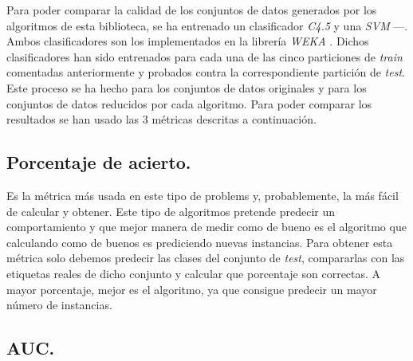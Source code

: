 Para poder comparar la calidad de los conjuntos de datos generados por los algoritmos de esta biblioteca, se ha entrenado un clasificador \textit{C4.5} \cite{c4.5} y una \textit{SVM} \cite{svm}—. Ambos clasificadores son los implementados en la librería \textit{WEKA} \cite{weka} \cite{wekaweb}. Dichos clasificadores han sido entrenados para cada una de las cinco particiones de \textit{train} comentadas anteriormente y probados contra la correspondiente partición de \textit{test}. Este proceso se ha hecho para los conjuntos de datos originales y para los conjuntos de datos reducidos por cada algoritmo. Para poder comparar los resultados se han usado las 3 métricas descritas a continuación.

\subsection{Porcentaje de acierto.} \label{subsec:porcentaje}

Es la métrica más usada en este tipo de problems y, probablemente, la más fácil de calcular y obtener. Este tipo de algoritmos pretende predecir un comportamiento y que mejor manera de medir como de bueno es el algoritmo que calculando como de buenos es prediciendo nuevas instancias. Para obtener esta métrica solo debemos predecir las clases del conjunto de \textit{test}, compararlas con las etiquetas reales de dicho conjunto y calcular que porcentaje son correctas. A mayor porcentaje, mejor es el algoritmo, ya que consigue predecir un mayor número de instancias.

\subsection{AUC.} \label{subsec:auc}

